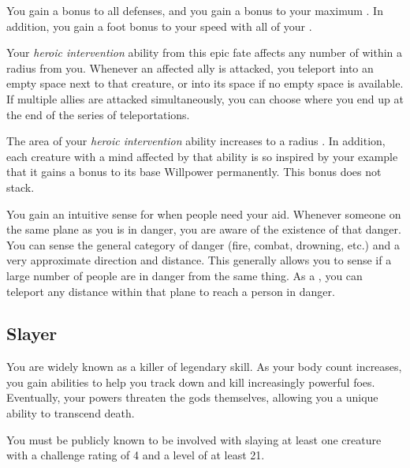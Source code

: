              You gain a  bonus to all defenses, and you gain a  bonus to your maximum .
            In addition, you gain a  foot bonus to your speed with all of your .

             Your \textit{heroic intervention} ability from this epic fate affects any number of  within a \areamed radius  from you.
            Whenever an affected ally is attacked, you teleport into an empty space next to that creature, or into its space if no empty space is available.
            If multiple allies are attacked simultaneously, you can choose where you end up at the end of the series of teleportations.

             The area of your \textit{heroic intervention} ability increases to a \areagarg radius .
            In addition, each creature with a mind affected by that ability is so inspired by your example that it gains a  bonus to its base Willpower permanently.
            This bonus does not stack.

             You gain an intuitive sense for when people need your aid.
            Whenever someone on the same plane as you is in danger, you are aware of the existence of that danger.
            You can sense the general category of danger (fire, combat, drowning, etc.) and a very approximate direction and distance.
            This generally allows you to sense if a large number of people are in danger from the same thing.
            As a , you can teleport any distance within that plane to reach a person in danger.

    \subsection{Slayer}
        You are widely known as a killer of legendary skill.
        As your body count increases, you gain abilities to help you track down and kill increasingly powerful foes.
        Eventually, your powers threaten the gods themselves, allowing you a unique ability to transcend death.

         You must be publicly known to be involved with slaying at least one creature with a challenge rating of 4 and a level of at least 21.


